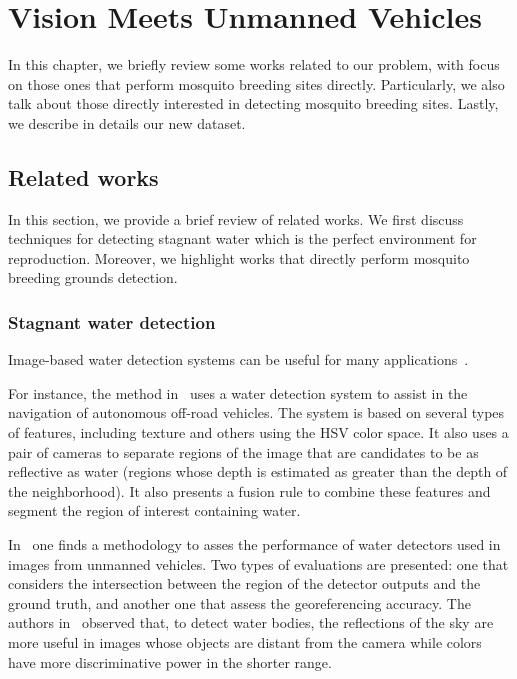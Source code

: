 \chapter{Vision Meets Unmanned Vehicles}
\label{chap:database}

In this chapter, we briefly review some works related to our problem, with focus on those ones that perform mosquito breeding sites directly.
Particularly, we also talk about those directly interested in detecting mosquito breeding sites.
Lastly, we describe in details our new dataset.

\section{Related works}\label{sec:trab_rel}
In this section, we provide a brief review of related works.
We first discuss techniques for detecting stagnant water which is the perfect environment for \Aedes reproduction.
Moreover, we highlight works that directly perform mosquito breeding grounds detection.

%
\subsection{Stagnant water detection}
Image-based water detection systems can be useful for many applications~\cite{Rankin2006, Rankin2010a, Rankin2010b, Zhang2010b, Rankin2011a, Santana2012a, Zhong2013a}.

For instance, the method in~\cite{Rankin2006} uses a water detection system to assist in the navigation of autonomous off-road vehicles.
The system is based on several types of features, including texture and others using the HSV color space.
It also uses a pair of cameras to separate regions of the image that are candidates to be as reflective as water (regions whose depth is estimated as greater than the depth of the neighborhood).
It also presents a fusion rule to combine these features and segment the region of interest containing water.

In~\cite{Rankin2010a} one finds a methodology to asses the performance of water detectors used in images from unmanned vehicles.
Two types of evaluations are presented: one that considers the intersection between the region of the detector outputs and the ground truth, and another one that assess the georeferencing accuracy.
The authors in~\cite{Rankin2010b} observed that, to detect water bodies, the reflections of the sky are more useful in images whose objects are distant from the camera while colors have more discriminative power in the shorter range.

